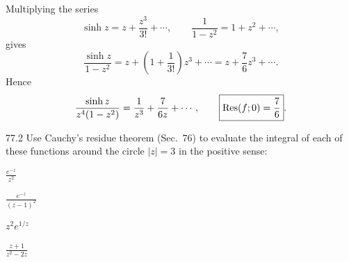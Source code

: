 \documentclass[11pt,oneside]{article}
\begin{document}
\begin{solution}
\begin{exercisesubparts}
    \item Multiplying the series
    \[
        \sinh z=z+\frac{z^3}{3!}+\cdots,
        \qquad\frac1{1-z^2}=1+z^2+\cdots,
    \]
    gives
    \[
        \frac{\sinh z}{1-z^2}
        =z+\left(1+\frac1{3!}\right)z^3+\cdots
        =z+\frac76z^3+\cdots.
    \]
    Hence
    \[
        \frac{\sinh z}{z^4(1-z^2)}
        =\frac1{z^3}+\frac7{6z}+\cdots,
        \qquad\boxed{\operatorname{Res}(f; 0)=\frac76}.
    \]
\end{exercisesubparts}
\end{solution}

\begin{exercise}{77.2}
Use Cauchy's residue theorem (Sec.~76) to evaluate the integral of each of these functions around the circle $|z|=3$ in the positive sense:
\begin{exercisesubparts}
    \item $\displaystyle\frac{e^{-z}}{z^2}$
    \item $\displaystyle\frac{e^{-z}}{(z-1)^2}$
    \item $\displaystyle z^2e^{1/z}$
    \item $\displaystyle\frac{z+1}{z^2-2z}$
\end{exercisesubparts}
\end{exercise}
\end{document}
